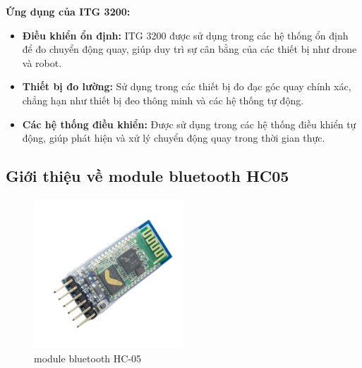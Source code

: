 \indent \textbf{Ứng dụng của ITG 3200:}
\begin{itemize}
\item \textbf{Điều khiển ổn định:} ITG 3200 được sử dụng trong các hệ thống ổn định để đo chuyển động quay, giúp duy trì sự cân bằng của các thiết bị như drone và robot.
\item \textbf{Thiết bị đo lường:} Sử dụng trong các thiết bị đo đạc góc quay chính xác, chẳng hạn như thiết bị đeo thông minh và các hệ thống tự động.
 \item \textbf{Các hệ thống điều khiển:} Được sử dụng trong các hệ thống điều khiển tự động, giúp phát hiện và xử lý chuyển động quay trong thời gian thực.
\end{itemize}

\subsection{Giới thiệu về module bluetooth HC05}
\begin{figure}[H]
    \centering
    \includegraphics[width=0.5\textwidth,height=\textheight,keepaspectratio]{Images/Theoretical basis/hc05.jpg}
    \caption{module bluetooth HC-05}
    \label{fig:capacitive_sensor}
\end{figure}

